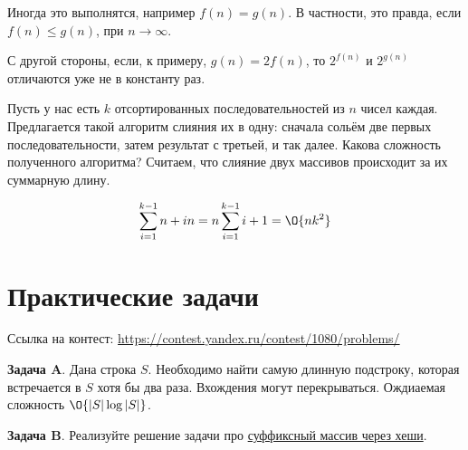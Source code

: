 \documentclass[addpoints]{exam}
\begin{document}
\begin{questions}
\begin{solution}
Иногда это выполнятся, например $f(n) = g(n)$. В частности, это правда, если $f(n) \leqslant g(n)$, при $n \to \infty$.

С другой стороны, если, к примеру, $g(n) = 2f(n)$, то $2^{f(n)}$ и $2^{g(n)}$ отличаются уже не в константу раз.

\end{solution}

\question[\half] Пусть у нас есть $k$ отсортированных последовательностей из $n$ чисел каждая. Предлагается такой алгоритм слияния их в одну: сначала сольём две первых последовательности, затем результат с третьей, и так далее. Какова сложность полученного алгоритма? Считаем, что слияние двух массивов происходит за их суммарную длину.

\begin{solution}

$$\sum\limits_{i=1}^{k-1} {n + in} = n \sum\limits_{i=1}^{k-1} {i + 1} = \O{n k^2}$$

\end{solution}


\section{Практические задачи}

Ссылка на контест: \url{https://contest.yandex.ru/contest/1080/problems/}

\question[1] \textbf{Задача A}. Дана строка $S$. Необходимо найти самую длинную подстроку, которая встречается в $S$ хотя бы два раза. Вхождения могут перекрываться. Ождиаемая сложность $\O{|S| \log{|S|}}$. 

\question[1] \textbf{Задача B}. Реализуйте решение задачи про \hyperref[sufarray]{суффиксный массив через хеши}. 

\end{questions}


\begin{center}
\pointtable[h][questions]
\end{center}
\end{document}
